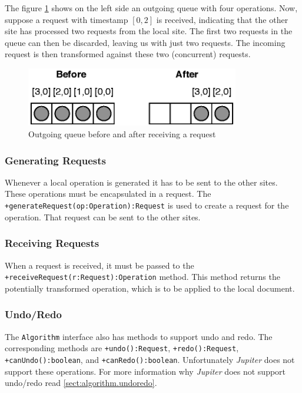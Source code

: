 The figure \ref{fig:algorithm.outqueue} shows on the left side an outgoing
queue with four operations. Now, suppose a request with timestamp $[0,2]$
is received, indicating that the other site has processed two requests
from the local site. The first two requests in the queue can then be
discarded, leaving us with just two requests. The incoming request is then
transformed against these two (concurrent) requests.

\begin{figure}[H]
\centering
\includegraphics[width=9.31cm,height=2.58cm]{../images/finalreport/algorithm_outqueue.eps}
\caption{Outgoing queue before and after receiving a request}
\label{fig:algorithm.outqueue}
\end{figure}

\subsubsection{Generating Requests}
Whenever a local operation is generated it has to be sent to the other sites.
These operations must be encapsulated in a request. The
\texttt{+generate\-Request(op:Operation):Request} is used to create a request
for the operation. That request can be sent to the other sites.

\subsubsection{Receiving Requests}
When a request is received, it must be passed to the
\texttt{+receive\-Request(r:Request):Operation} method. This method returns
the potentially transformed operation, which is to be applied to the
local document.

\subsubsection{Undo/Redo}
The \texttt{Algorithm} interface also has methods to support undo and redo.
The corresponding methods are 
\texttt{+undo():Request}, \texttt{+redo():Request},
\texttt{+canUndo():boolean}, and \texttt{+canRedo():boolean}. 
Unfortunately
\emph{Jupiter} does not support these operations. For more information why
\emph{Jupiter} does not support undo/redo read \ref{sect:algorithm.undoredo}.

